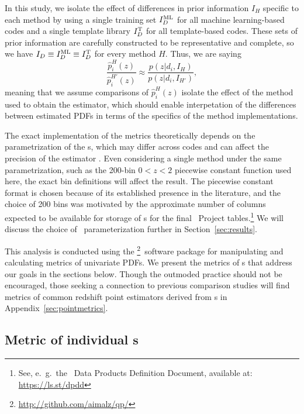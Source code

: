 In this study, we isolate the effect of differences in prior information $I_{H}$ specific to each method by using a single training set $I_{D}^{\rm ML}$ for all machine learning-based codes and a single template library $I_{D}^{\rm T}$ for all template-based codes.
These sets of prior information are carefully constructed to be representative and complete, so we have $I_{D} \equiv I_{D}^{\rm ML} \equiv I_{D}^{\rm T}$ for every method $H$.
Thus, we are saying
\begin{equation}
\frac{\hat{p}_{i}^{H}(z)}{\hat{p}_{i}^{H'}(z)} \approx \frac{p(z \vert d_{i}, I_{H})}{p(z \vert d_{i}, I_{H'})},
\end{equation}
meaning that we assume comparisons of $\hat{p}_{i}^{H}(z)$ isolate the effect of the method used to obtain the estimator, which should enable interpetation of the differences between estimated PDFs in terms of the specifics of the method implementations.

The exact implementation of the metrics theoretically depends on the parametrization of the \pzpdf s, which may differ across codes and can affect the precision of the estimator \citep{Malz:qp}.
Even considering a single method under the same parametrization, such as the 200-bin $0 < z < 2$ piecewise constant function used here, the exact bin definitions will affect the result.
The piecewise constant format is chosen because of its established presence in the literature, and the choice of 200 bins was motivated by the approximate number of columns expected to be available for storage of \pzpdf s for the final \lsst\ Project tables.\footnote{See, e.~g.~the \lsst\ Data Products Definition Document, available at: \url{https://ls.st/dpdd}}
We will discuss the choice of \pzpdf\ parameterization further in Section~\ref{sec:results}.

This analysis is conducted using the \qp\footnote{\url{http://github.com/aimalz/qp/}}\ software package \citep{Malz:qp} for manipulating and calculating metrics of univariate PDFs.
We present the metrics of \pzpdf s that address our goals in the sections below.
Though the outmoded practice should not be encouraged, those seeking a connection to previous comparison studies will find metrics of common redshift point estimators derived from \pzpdf s in Appendix~\ref{sec:pointmetrics}.

\subsection{Metric of individual \pzpdf s}
\label{sec:CDE_loss}

